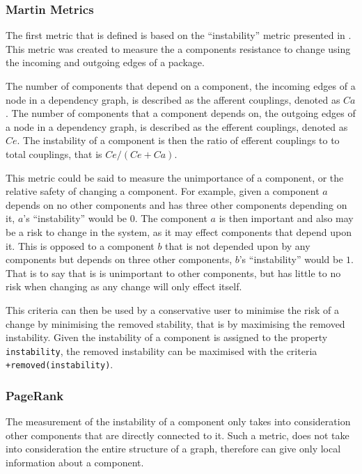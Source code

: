 \subsubsection{Martin Metrics}
The first metric that is defined is based on the ``instability'' metric presented in \cite{martin2003}.
This metric was created to measure the a components resistance to change using the incoming and outgoing edges of a package.

\begin{defs}
The number of components that depend on a component, the incoming edges of a node in a dependency graph, is described as the afferent couplings, denoted as $Ca$.
The number of components that a component depends on, the outgoing edges of a node in a dependency graph, is described as the efferent couplings, denoted as $Ce$. 
The instability of a component is then the ratio of efferent couplings to to total couplings, that is $Ce/(Ce+Ca)$.
\end{defs}

This metric could be said to measure the unimportance of a component, or the relative safety of changing a component.
For example, given a component $a$ depends on no other components and has three other components depending on it, $a$'s ``instability'' would be $0$.
The component $a$ is then important and also may be a risk to change in the system, as it may effect components that depend upon it.
This is opposed to a component $b$ that is not depended upon by any components but depends on three other components, $b$'s ``instability'' would be $1$.
That is to say that is is unimportant to other components, but has little to no risk when changing as any change will only effect itself.

This criteria can then be used by a conservative user to minimise the risk of a change by minimising the removed stability,
that is by maximising the removed instability.
Given the instability of a component is assigned to the property \verb+instability+,
the removed instability can be maximised with the criteria \verb!+removed(instability)!.

\subsubsection{PageRank}
The measurement of the instability of a component only takes into consideration other components that are directly connected to it.
Such a metric, does not take into consideration the entire structure of a graph, therefore can give only local information about a component.

